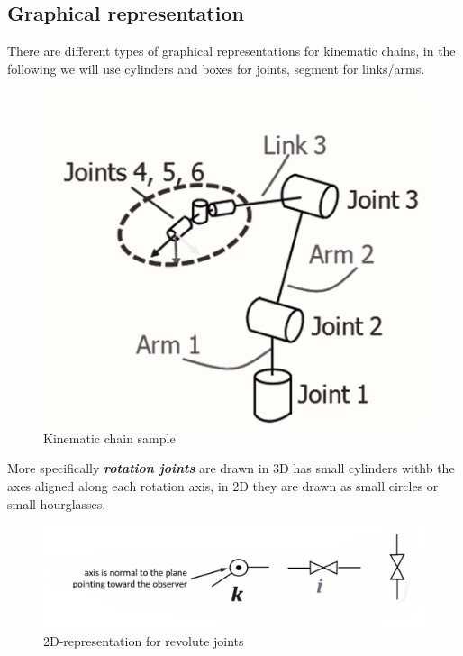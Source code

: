 \subsection{Graphical representation}
There are different types of graphical representations for kinematic chains, in the following we will use cylinders and boxes for joints, segment for links/arms. 

\begin{figure}
    \centering
    \includegraphics[scale=0.5]{img/KC_sample.png}
    \caption{Kinematic chain sample}
    \label{fig:KC_sample}
\end{figure}
More specifically \textit{\textbf{rotation joints}} are drawn in 3D has small cylinders withb the axes aligned along each rotation axis, in 2D they are drawn as small circles or small hourglasses.

\begin{figure}[h]
    \centering
    \includegraphics[scale=0.6]{img/rot_joints.png}
    \caption{2D-representation for revolute joints}
\end{figure}

